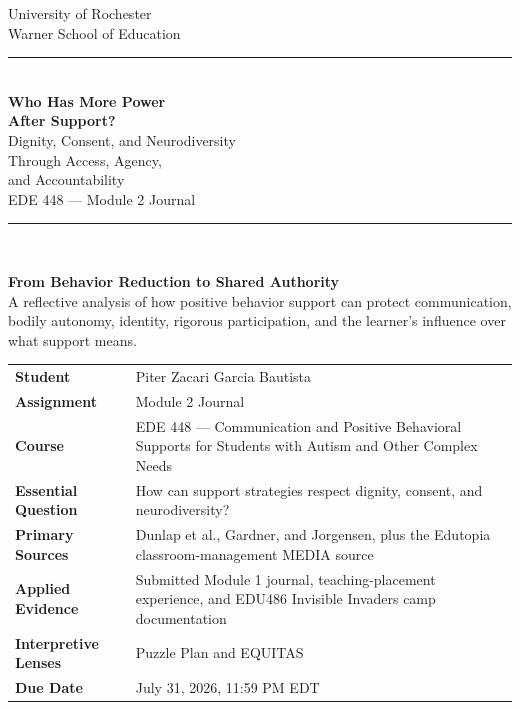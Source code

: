 \documentclass[11pt]{article}
\begin{document}
\hypersetup{pageanchor=false}
\begin{titlepage}
\thispagestyle{empty}

\begin{center}
{\large University of Rochester\\}
{\normalsize Warner School of Education\\[0.15in]}

{\color{PrimaryRed}\rule{\textwidth}{1.4pt}}\\[0.12in]
{\Huge\bfseries Who Has More Power\\[0.07in]
After Support?}\\[0.15in]
{\huge Dignity, Consent, and Neurodiversity\\[0.07in]
Through Access, Agency,\\[0.07in]
and Accountability}\\[0.18in]
{\Large EDE 448 --- Module 2 Journal}\\[0.12in]

\vfill

{\color{PrimaryRed}\rule{0.78\textwidth}{0.7pt}}\\[0.22in]

\colorbox{SoftBlue}{%
\parbox{0.88\textwidth}{%
\centering\small\vspace{0.02in}
\textbf{From Behavior Reduction to Shared Authority}\\[0.05in]
A reflective analysis of how positive behavior support can protect communication, bodily autonomy, identity, rigorous participation, and the learner's influence over what support means.
}%
}
\end{center}

\vfill

\begin{center}
\renewcommand{\arraystretch}{1.18}
\setlength{\tabcolsep}{4pt}
\begin{tabular}{>{\bfseries\RaggedLeft\arraybackslash}p{1.65in} >{\RaggedRight\arraybackslash}p{5.0in}}
Student & Piter Zacari Garcia Bautista \\
Assignment & Module 2 Journal \\
Course & EDE 448 --- Communication and Positive Behavioral Supports for Students with Autism and Other Complex Needs \\
Essential Question & How can support strategies respect dignity, consent, and neurodiversity? \\
Primary Sources & Dunlap et al., Gardner, and Jorgensen, plus the Edutopia classroom-management MEDIA source \\
Applied Evidence & Submitted Module 1 journal, teaching-placement experience, and EDU486 Invisible Invaders camp documentation \\
Interpretive Lenses & Puzzle Plan and EQUITAS \\
Due Date & July 31, 2026, 11:59 PM EDT \\
\end{tabular}
\end{center}


\end{titlepage}
\end{document}
